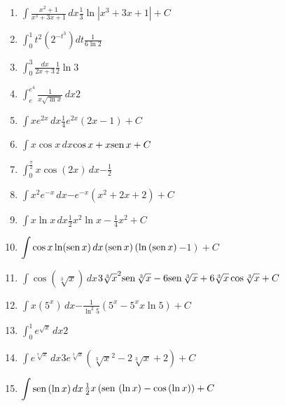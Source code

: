 {\begin{enumerate}
\item {$\displaystyle{\int \frac{x^{2}+1}{x^{3}+3x+1}\, dx}$}{$\frac{1}{3}\ln \left\vert x^{3}+3x+1\right\vert +C$}

\item {$\displaystyle{\int_{0}^{1}t^{2}\left( 2^{-t^{3}}\right) dt}$}{$\frac{1}{6\ln 2}$}

\item {$\displaystyle{\int_{0}^{3}\frac{dx}{2x+3}}$}{$\frac{1}{2}\ln 3$}

\item {$\displaystyle{\int_{e}^{e^{4}}\frac{1}{x\sqrt{\ln x}}\, dx}$}{$2$}

\item {$\displaystyle{\int xe^{2x}\, dx}$}{$\frac{1}{4}e^{2x}\left( 2x-1\right)+C $}

\item {$\displaystyle{\int x\cos x\, dx}$}{$\cos x+x\text{\rm sen}\, x+C$}

\item {$\displaystyle{\int_{0}^{\frac{\pi }{2}}x\cos (2x)\, dx}$}{$-\frac{1}{2}$}

\item {$\displaystyle{\int x^{2}e^{-x}\, dx}$}{$-e^{-x}\left( x^{2}+2x+2\right)+C $}

\item {$\displaystyle{\int x\ln x\, dx}$}{$\frac{1}{2}x^{2}\ln x-\frac{1}{4}x^{2}+C$}

\item {$\displaystyle{\int \cos x\ln (\text{\rm sen}\,x)\, dx}$}{$\left( \text{\rm sen}\, x\right) \left( \ln \left( \text{\rm sen}\, x\right)\right.$\linebreak $\left. -1\right)+C $}

\item {$\displaystyle{\int \cos \left( \sqrt[3]{x}\right) \, dx}$}{$\allowbreak 3\sqrt[3]{x}^{2}\text{\rm sen}\,
\sqrt[3]{x}-6\text{\rm sen}\, \sqrt[3]{x}+6\sqrt[3]{x}\cos \sqrt[3]{x}+C$}

\item {$\displaystyle{\int x\left( 5^{x}\right) \, dx}$}{$-\frac{1}{\ln ^{2}5}\left( 5^{x}-5^{x}x\ln 5\right)+C $}

\item {$\displaystyle{\int_{0}^{1}e^{\sqrt{x}}\, dx}$}{$2$}

\item {$\displaystyle{\int e^{\sqrt[3]{x}}\, dx}$}{\linebreak$3e^{\sqrt[3]{x}}\left( \sqrt[3]{x}^{2}-2\sqrt[3]{x}+2\right)+C $}

\item {$\displaystyle{\int \text{\rm sen}\,(\ln x)\, dx}$}{$\frac{1}{2}x\left( \text{\rm sen}\, \left( \ln x\right) -\cos\left( \ln x\right) \right)+C $}


\end{enumerate}}
